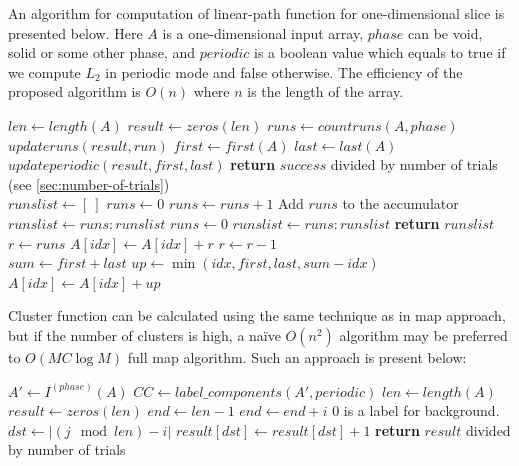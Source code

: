 \documentclass[1p]{elsarticle}
\begin{document}
An algorithm for computation of linear-path function for one-dimensional slice
is presented below. Here $A$ is a one-dimensional input array, $phase$ can be
void, solid or some other phase, and $periodic$ is a boolean value which equals
to true if we compute $L_2$ in periodic mode and false otherwise. The efficiency
of the proposed algorithm is $O(n)$ where $n$ is the length of the array.
\begin{algorithmic}[1]
    \State $len \gets length(A)$
    \State $result \gets zeros(len)$
    \State $runs \gets countruns(A, phase)$
      \State $updateruns(result, run)$
    \EndFor
      \State $first \gets first(A)$
      \State $last \gets last(A)$
        \State $updateperiodic(result, first, last)$
      \EndIf
    \EndIf
    \State \textbf{return} $success$ divided by number of trials
    (see \cref{sec:number-of-trials})
  \EndProcedure
  \\
    \State $runslist \gets [\ ]$
    \State $runs \gets 0$
        \State $runs \gets runs + 1$
        \Comment Add $runs$ to the accumulator
        \State $runslist \gets runs:runslist$
        \State $runs \gets 0$
      \EndIf
    \EndFor
      \State $runslist \gets runs:runslist$
    \EndIf
    \State \textbf{return} $runslist$
  \EndProcedure
  \\
    \State $r \gets runs$
      \State $A[idx] \gets A[idx] + r$
      \State $r \gets r - 1$
    \EndFor
  \EndProcedure
  \\
    \State $sum \gets first + last$
      \State $up \gets \min(idx, first, last, sum - idx)$
      \State $A[idx] \gets A[idx] + up$
    \EndFor
  \EndProcedure
\end{algorithmic}

Cluster function can be calculated using the same technique as in map approach,
but if the number of clusters is high, a naïve $O(n^2)$ algorithm may be
preferred to $O(MC \log M)$ full map algorithm. Such an approach is present below:
\begin{algorithmic}[1]
    \State $A' \gets I^{(phase)}(A)$
    \State $CC \gets label\_components(A', periodic)$
    \State $len \gets length(A)$
    \State $result \gets zeros(len)$
        \State $end \gets len-1$
          \State $end \gets end + i$
        \EndIf
            \Comment $0$ is a label for background.
            \State $dst \gets |(j \mod len) - i|$
            \State $result[dst] \gets result[dst] + 1$
          \EndIf
        \EndFor
      \EndFor
    \EndFor
    \State \textbf{return} $result$ divided by number of trials
  \EndProcedure
\end{algorithmic}
\end{document}
